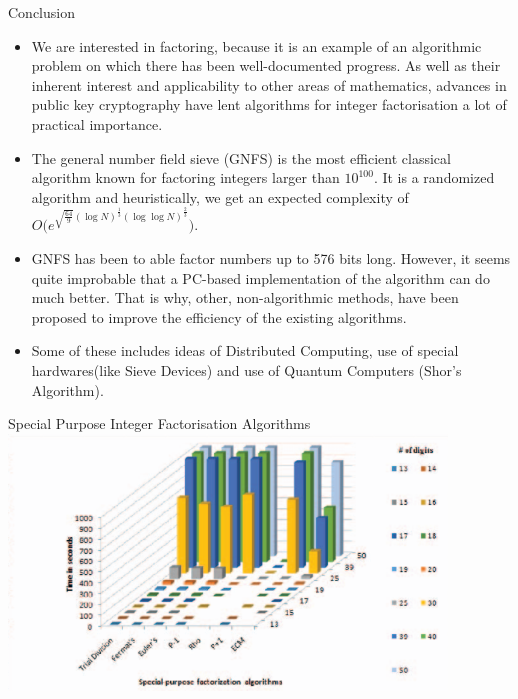 \documentclass{beamer}
\begin{document}
\begin{frame}{Conclusion}
\begin{itemize}
    \item We are interested in factoring, because it is an example of an algorithmic problem on which there has been well-documented progress. As well as their inherent interest and applicability to other areas of mathematics, advances in public key cryptography have lent algorithms for integer factorisation a lot of practical importance.
    \item The general number field sieve (GNFS) is the most efficient classical algorithm known for factoring integers larger than $10^{100}$. It is a randomized algorithm and heuristically, we get an expected complexity of $O\Big(e^{\sqrt{\frac{64}{9}}(\log N)^{\frac 13}(\log\log N)^{\frac 23}}\Big)$.
    \item GNFS has been to able factor numbers up to 576 bits long. However, it seems quite improbable that a PC-based implementation of the algorithm can do much better. That is why, other, non-algorithmic methods, have been proposed to improve the efficiency of the existing algorithms.
    \item Some of these includes ideas of Distributed Computing, use of special hardwares(like Sieve Devices) and use of Quantum Computers (Shor's Algorithm). 
\end{itemize}
    
\end{frame}


\begin{frame}{Special Purpose Integer Factorisation Algorithms}
 \includegraphics[height=6.8cm]{Comparison-2.png}
\centering   
\end{frame}
\end{document}
